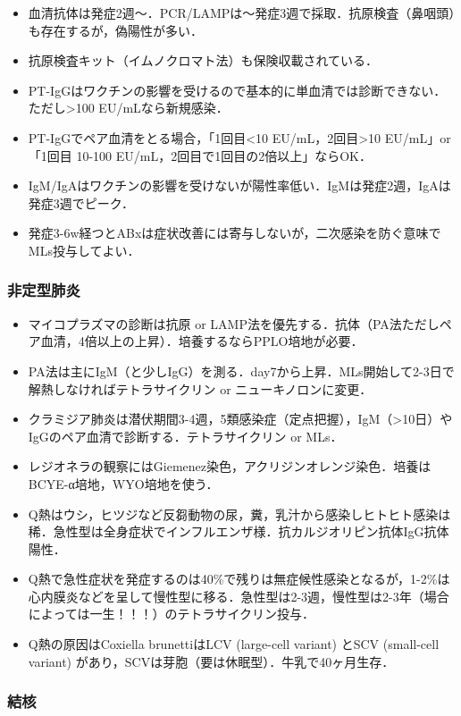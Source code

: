 \begin{itemize}
\item 血清抗体は発症2週〜．PCR/LAMPは〜発症3週で採取．抗原検査（鼻咽頭）も存在するが，偽陽性が多い．
\item 抗原検査キット（イムノクロマト法）も保険収載されている．
\item PT-IgGはワクチンの影響を受けるので基本的に単血清では診断できない．ただし>100 EU/mLなら新規感染．
\item PT-IgGでペア血清をとる場合，「1回目<10 EU/mL，2回目>10 EU/mL」or「1回目 10-100 EU/mL，2回目で1回目の2倍以上」ならOK．
\item IgM/IgAはワクチンの影響を受けないが陽性率低い．IgMは発症2週，IgAは発症3週でピーク．
\item 発症3-6w経つとABxは症状改善には寄与しないが，二次感染を防ぐ意味でMLs投与してよい．
\end{itemize}


\subsubsection{非定型肺炎}

\begin{itemize}
\item マイコプラズマの診断は抗原 or LAMP法を優先する．抗体（PA法ただしペア血清，4倍以上の上昇）．培養するならPPLO培地が必要．
\item PA法は主にIgM（と少しIgG）を測る．day7から上昇．MLs開始して2-3日で解熱しなければテトラサイクリン or ニューキノロンに変更．
\item クラミジア肺炎は潜伏期間3-4週，5類感染症（定点把握），IgM（>10日）やIgGのペア血清で診断する．テトラサイクリン or MLs．
\item レジオネラの観察にはGiemenez染色，アクリジンオレンジ染色．培養はBCYE-α培地，WYO培地を使う．
\item Q熱はウシ，ヒツジなど反芻動物の尿，糞，乳汁から感染しヒトヒト感染は稀．急性型は全身症状でインフルエンザ様．抗カルジオリピン抗体IgG抗体陽性．
\item Q熱で急性症状を発症するのは40\%で残りは無症候性感染となるが，1-2\%は心内膜炎などを呈して慢性型に移る．急性型は2-3週，慢性型は2-3年（場合によっては一生！！！）のテトラサイクリン投与．
\item Q熱の原因はCoxiella brunettiはLCV (large-cell variant) とSCV (small-cell variant) があり，SCVは芽胞（要は休眠型）．牛乳で40ヶ月生存．
\end{itemize}


\subsubsection{結核}


